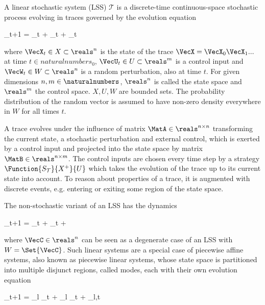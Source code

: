 \startsubsection[title={Linear Stochastic Systems},reference=sec:theory-hybrids-lss]

    A linear stochastic system (LSS) $\mathcal{T}$ is a discrete-time continuous-space stochastic process evolving in traces governed by the evolution equation

    \startformula
        \VecX_{t+1} = \MatA \VecX_t + \MatB \VecU_t + \VecW_t \EndComma
    \stopformula

    where $\VecX_t \in X \subset \reals^n$ is the state of the trace $\VecX = \VecX_0 \VecX_1 ...$ at time $t \in naturalnumbers_0$,
    $\VecU_t \in U \subset \reals^m$ is a control input and
    $\VecW_t \in W \subset \reals^n$ is a random perturbation, also at time $t$.
    For given dimensions $n, m \in \naturalnumbers$, $\reals^n$ is called the state space and $\reals^m$ the control space.
    $X, U, W$ are bounded sets.
    The probability distribution of the random vector is assumed to have non-zero density everywhere in $W$ for all times $t$.

    A trace evolves under the influence of matrix $\MatA \in \reals^{n \times n}$ transforming the current state, a stochastic perturbation and external control, which is exerted by a control input and projected into the state space by matrix $\MatB \in \reals^{n \times m}$.
    The control inputs are chosen every time step by a strategy $\Function{S_\mathcal{T}}{X^+}{U}$ which takes the evolution of the trace up to its current state into account. %
    To reason about properties of a trace, it is augmented with discrete events, e.g. entering or exiting some region of the state space.

\stopsubsection


\startsubsection[title={Related Systems}]

    The non-stochastic variant of an LSS has the dynamics

    \startformula
        \VecX_{t+1} = \MatA \VecX_t + \MatB \VecU_t + \VecC \EndComma
    \stopformula

    where $\VecC \in \reals^n$ can be seen as a degenerate case of an LSS with $W = \Set{\VecC}$.
    Such linear systems are a special case of piecewise affine systems, also known as piecewise linear systems, whose state space is partitioned into multiple disjunct regions, called modes, each with their own evolution equation

    \startformula
        \VecX_{t+1} = \MatA_l \VecX_t + \MatB_l \VecU_t + \VecW_{l,t} \EndComma
    \stopformula

